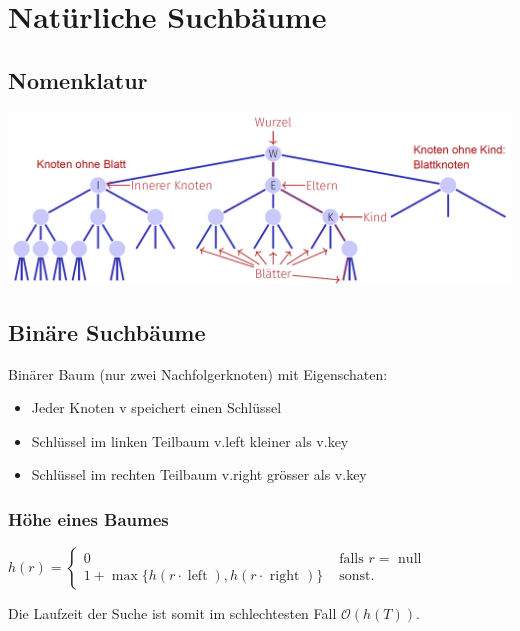 \section{Natürliche Suchbäume}

\begin{sectionbox}
\subsection{Nomenklatur}
\begin{center}
    \includegraphics[width = \columnwidth]{../img/BaumNomen.png}
\end{center}
\end{sectionbox}

\begin{sectionbox}
\subsection{Binäre Suchbäume}\smallskip
Binärer Baum (nur zwei Nachfolgerknoten) mit Eigenschaten:\par
\begin{itemize}
    \item Jeder Knoten v speichert einen Schlüssel
    \item Schlüssel im linken Teilbaum v.left kleiner als v.key
    \item Schlüssel im rechten Teilbaum v.right grösser als v.key
\end{itemize}\vspace{7px}

\subsubsection{Höhe eines Baumes}\smallskip
$h(r)=\left\{\begin{array}{ll}0 & \text { falls } r=\text { null } \\ 1+\max \{h(r \cdot \operatorname{left}), h(r \cdot \text { right })\} & \text { sonst. }\end{array}\right.$\par\smallskip
Die Laufzeit der Suche ist somit im schlechtesten Fall $\mathcal{O}(h(T))$.\par\smallskip
\end{sectionbox}

